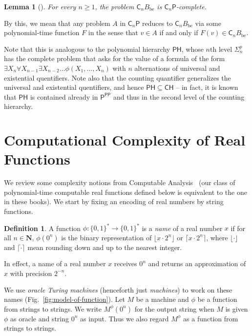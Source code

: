 \documentclass{lmcs}
\newtheorem{lemma}[theorem]{Lemma}
\theoremstyle{definition}
\newtheorem{definition}[theorem]{Definition}
\theoremstyle{remark}
\newcommand{\N}{\mathbf N}
\newcommand{\classP}{\mathsf{P}}
\newcommand{\classPH}{\mathsf{PH}}
\newcommand{\classPP}{\mathsf{PP}}
\newcommand{\classCH}{\mathsf{CH}}
\newcommand{\classSigma}{\mathsf{\Sigma}}
\newcommand{\quantC}{\mathsf{C}}
\begin{document}
\begin{lemma}[{\cite[Theorem 7]{wagner1986complexity}}] \label{lemma:CnP-complete}
 For every $n \ge 1$, 
 the problem $\quantC_n B_{\mathrm{be}}$ is $\quantC_n\classP$-complete.
\end{lemma}

By this, we mean that 
any problem $A$ in $\quantC_n \classP$ reduces to $\quantC_n B_{\mathrm{be}}$ 
via some polynomial-time function $F$ 
in the sense that $v \in A$ if and only if $F (v) \in \quantC_n B_{\mathrm{be}}$. 

Note that this is analogous to the polynomial hierarchy $\classPH$, 
whose $n$th level $\classSigma ^p _n$ has the complete problem
that asks for the value of a formula of the form $
\exists X _n \forall X _{n - 1} \exists X _{n - 2} \ldots \allowbreak \phi (X_1, \dots, X_n)
$ with $n$ alternations of universal and existential quentifiers. 
Note also that the counting quantifier generalizes 
the universal and existential quentifiers, and hence $\classPH \subseteq \classCH$ -- 
in fact, it is known~\cite{toda} that 
$\classPH$ is contained already in $\classP ^{\classPP}$
and thus in the second level of the counting hierarchy. 

\section{Computational Complexity of Real Functions}
\label{section: preliminaries}

We review some complexity notions 
from Computable Analysis~%
\cite{ko1991complexity,weihrauch00:_comput_analy}
(our class of polynomial-time computable real functions defined below
is equivalent to the one in these books). 
We start by fixing an encoding of real numbers 
by string functions.

\begin{definition}
 A function $\phi \colon \{0, 1\} ^* \to \{0, 1\}^*$ is a \emph{name} of a real number $x$ 
 if for all $n \in \N$,
 $\phi(0^n)$ is the binary representation of $\lfloor x \cdot 2^n \rfloor$ or
 $\lceil x \cdot 2^n \rceil$,
 where $\lfloor \cdot \rfloor$ and $\lceil \cdot \rceil$ mean
 rounding down and up to the nearest integer.
 \end{definition}

In effect, a name of a real number $x$ receives $0 ^n$ and 
returns an approximation of $x$ with precision $2 ^{-n}$.

We use \emph{oracle Turing machines} (henceforth just \emph{machines})
to work on these names (Fig.~\ref{fig:model-of-function}).
Let $M$ be a machine and $\phi$ be a function from strings to strings. 
We write $M ^\phi (0 ^n)$ for the output string 
when $M$ is given
$\phi$ as oracle and string $0^n$ as input.
Thus we also regard $M^\phi$ as a function from strings to strings.
\end{document}
